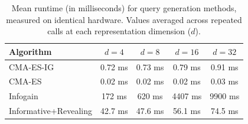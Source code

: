 \begin{table}[t]
\centering
\caption{Mean runtime (in milliseconds) for query generation methods, measured on identical hardware. Values averaged across repeated calls at each representation dimension ($d$).}
\label{tab:runtime}
\begin{tabular}{l cccc}
\toprule
\textbf{Algorithm} & $d=4$ & $d=8$ & $d=16$ & $d=32$ \\
\midrule
CMA-ES-IG & 0.72 ms & 0.73 ms & 0.79 ms & 0.91 ms \\
CMA-ES & 0.02 ms & 0.02 ms & 0.02 ms & 0.03 ms \\
Infogain & 172 ms & 620 ms & 4407 ms & 9900 ms \\
Informative+Revealing & 42.7 ms & 47.6 ms & 56.1 ms & 74.5 ms \\
\bottomrule
\end{tabular}
\end{table}
